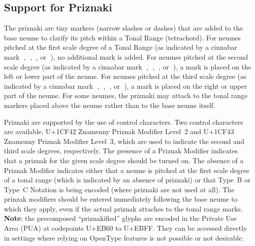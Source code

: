 \documentclass[11pt]{article}
\begin{document}
\subsection{Support for Priznaki}

The priznaki are tiny markers (narrow slashes or dashes) that are added
to the base neume to clarify its pitch within a Tonal Range (tetrachord).
For neumes pitched at the first scale degree of a Tonal Range (as indicated 
by a cinnabar mark {\musicFont ◌𜼀}, {\musicFont ◌𜼃}, {\musicFont ◌𜼆}, or {\musicFont ◌𜼉}),
no additional mark is added. For neumes pitched at the second scale degree
(as indicated by a cinnabar mark {\musicFont ◌𜼁}, {\musicFont ◌𜼄}, {\musicFont ◌𜼇},
or {\musicFont ◌𜼊}), a mark is placed on the left or lower part of the neume.
For neumes pitched at the third scale degree (as indicated by a cinnabar mark 
{\musicFont ◌𜼂}, {\musicFont ◌𜼅}, {\musicFont ◌𜼈}, or {\musicFont ◌𜼋}), a mark is
placed on the right or upper part of the neume. For some neumes, the priznaki may
attach to the tonal range markers placed above the neume rather
than to the base neume itself.

Priznaki are supported by the use of control characters. Two control characters
are available, U+1CF42 Znamenny Priznak Modifier Level~2 and
U+1CF43 Znamenny Priznak Modifier Level~3, which are used to indicate the second and
third scale degrees, respectively. The presence of a Priznak Modifier indicates
that a priznak for the given scale degree should be turned on.
The absence of a Priznak Modifier indicates either that a neume is pitched at the
first scale degree of a tonal range (which is indicated by an absence of priznaki)
or that Type~B or Type~C Notation is being encoded
(where priznaki are not used at all).
The prinzak modifiers should be entered immediately following the base neume to
which they apply, even if the actual priznak attaches to the tonal range marks.
\textbf{Note}: the precomposed ``priznakified'' glyphs are encoded in the
Private Use Area (PUA) at codepoints U+EB60 to U+EBFF. They can be accessed directly
in settings where relying on OpenType features is not possible or not desirable.
\end{document}
